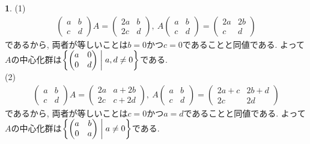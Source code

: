 \documentclass{article}
\theoremstyle{definition}
\newtheorem{ans}{}
\numberwithin{ans}{subsection}
\begin{document}
\begin{ans}
  (1)
  \begin{align*}
    \begin{pmatrix*}
      a & b \\
      c & d
    \end{pmatrix*} A = \begin{pmatrix*}
      2a & b \\
      2c & d
    \end{pmatrix*},\ A \begin{pmatrix*}
      a & b \\
      c & d
    \end{pmatrix*} = \begin{pmatrix*}
      2a & 2b \\
      c & d
    \end{pmatrix*}
  \end{align*}
  であるから, 両者が等しいことは$b = 0$かつ$c = 0$であることと同値である.
  よって$A$の中心化群は$\biggl\{\begin{pmatrix*}
    a & 0 \\
    0 & d \\
  \end{pmatrix*} \biggm\vert a, d \neq 0 \biggr\}$である.\\
  (2)
  \begin{align*}
    \begin{pmatrix*}
      a & b \\
      c & d
    \end{pmatrix*} A = \begin{pmatrix*}
      2a & a + 2b \\
      2c & c + 2d
    \end{pmatrix*},\ A \begin{pmatrix*}
      a & b \\
      c & d
    \end{pmatrix*} = \begin{pmatrix*}
      2a + c & 2b + d \\
      2c & 2d
    \end{pmatrix*}
  \end{align*}
  であるから, 両者が等しいことは$c = 0$かつ$a = d$であることと同値である.
  よって$A$の中心化群は$\biggl\{\begin{pmatrix*}
    a & b \\
    0 & a \\
  \end{pmatrix*} \biggm\vert a \neq 0 \biggr\}$である.
\end{ans}
\end{document}
